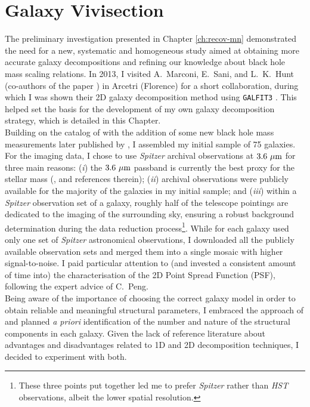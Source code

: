 \chapter{Galaxy Vivisection}
\label{ch:galviv}

The preliminary investigation presented in Chapter \ref{ch:recov-mn} \citep{savorgnan2013} 
demonstrated the need for a new, systematic and homogeneous study 
aimed at obtaining more accurate galaxy decompositions 
and refining our knowledge about black hole mass scaling relations. 
In 2013, I visited A.~Marconi, E.~Sani, and L.~K.~Hunt (co-authors of the paper \citealt{sani2011}) 
in Arcetri (Florence) for a short collaboration, 
during which I was shown their 2D galaxy decomposition method using {\tt GALFIT3} \citep{peng2010}. 
This helped set the basis for the development of my own galaxy decomposition strategy, 
which is detailed in this Chapter. \\

Building on the catalog of \cite{grahamscott2013} 
with the addition of some new black hole mass measurements later published by \cite{rusli2013bhmassesDM}, 
I assembled my initial sample of 75 galaxies. 
For the imaging data, 
I chose to use \emph{Spitzer} archival observations at $3.6~\mu \rm m$ for three main reasons: 
(\emph{i}) the $3.6~\mu \rm m$ passband is currently the best proxy for the stellar mass 
(\citealt{sheth2010}, and references therein); 
(\emph{ii}) archival observations were publicly available for the majority of the galaxies in my initial sample; 
and (\emph{iii}) within a \emph{Spitzer} observation set of a galaxy, 
roughly half of the telescope pointings are dedicated to the imaging of the surrounding sky, 
ensuring a robust background determination during the data reduction process\footnote{These three points put together 
led me to prefer \emph{Spitzer} rather than \emph{HST} observations, 
albeit the lower spatial resolution. }. 
While for each galaxy \cite{sani2011} used only one set of \emph{Spitzer} astronomical observations, 
I downloaded all the publicly available observation sets and merged them into a single mosaic with higher signal-to-noise. 
I paid particular attention to (and invested a consistent amount of time into) the characterisation of the 
2D Point Spread Function (PSF), following the expert advice of C.~Peng. \\

Being aware of the importance of choosing the correct galaxy model 
in order to obtain reliable and meaningful structural parameters, 
I embraced the approach of \cite{laurikainen2005} 
and planned \emph{a priori} identification of the number and nature of the structural components in each galaxy. 
Given the lack of reference literature about advantages and disadvantages 
related to 1D and 2D decomposition techniques, 
I decided to experiment with both. \\ 

